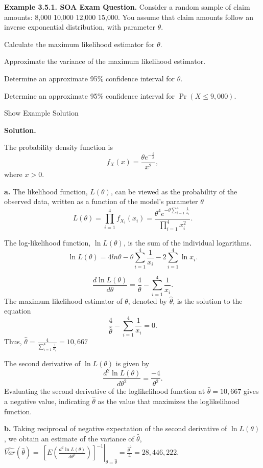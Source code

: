 \documentclass[]{book}
\theoremstyle{definition}
\theoremstyle{definition}
\theoremstyle{definition}
\theoremstyle{remark}
\begin{document}
\textbf{Example 3.5.1. SOA Exam Question.} Consider a random sample of
claim amounts: 8,000 10,000 12,000 15,000. You assume that claim amounts
follow an inverse exponential distribution, with parameter \(\theta\).

Calculate the maximum likelihood estimator for \(\theta\).

Approximate the variance of the maximum likelihood estimator.

Determine an approximate 95\% confidence interval for \(\theta\).

Determine an approximate 95\% confidence interval for
\(\Pr \left( X \leq 9,000 \right).\)

Show Example Solution

\hypertarget{toggleExampleLoss.5.1}{}
\textbf{Solution.}

The probability density function is
\[f_{X}\left( x \right) = \frac{\theta e^{- \frac{\theta}{x}}}{x^{2}}, \]
where \(x > 0\).

\textbf{a.} The likelihood function, \(L\left( \theta \right)\), can be
viewed as the probability of the observed data, written as a function of
the model's parameter \(\theta\)
\[L\left( \theta \right) = \prod_{i = 1}^{4}{f_{X_{i}}\left( x_{i} \right)} = \frac{\theta^{4}e^{- \theta\sum_{i = 1}^{4}\frac{1}{x_{i}}}}{\prod_{i = 1}^{4}x_{i}^{2}}.\]

The log-likelihood function, \(\ln L \left( \theta \right)\), is the sum
of the individual logarithms.
\[\ln L \left( \theta \right) = 4ln\theta - \theta\sum_{i = 1}^{4}\frac{1}{x_{i}} - 2\sum_{i = 1}^{4}\ln x_{i} .\]

\[\frac{d \ln L \left( \theta \right)}{d \theta} = \frac{4}{\theta} - \sum_{i = 1}^{4}\frac{1}{x_{i}}.\]
The maximum likelihood estimator of \(\theta\), denoted by
\(\hat{\theta}\), is the solution to the equation
\[\frac{4}{\hat{\theta}} - \sum_{i = 1}^{4}{\frac{1}{x_{i}} = 0}.\]
Thus,
\(\hat{\theta} = \frac{4}{\sum_{i = 1}^{4}\frac{1}{x_{i}}} = 10,667\)

The second derivative of \(\ln L \left( \theta \right)\) is given by
\[\frac{d^{2}\ln L\left( \theta \right)}{d\theta^{2}} = \frac{- 4}{\theta^{2}}.\]
Evaluating the second derivative of the loglikelihood function at
\(\hat{\theta} = 10,667\) gives a negative value, indicating
\(\hat{\theta}\) as the value that maximizes the loglikelihood function.

\textbf{b.} Taking reciprocal of negative expectation of the second
derivative of \(\ln L \left( \theta \right)\), we obtain an estimate of
the variance of \(\hat{\theta}\),
\(\widehat{Var}\left( \hat{\theta} \right) = \left. \ \left\lbrack E\left( \frac{d^{2}\ln L \left( \theta \right)}{d\theta^{2}} \right) \right\rbrack^{- 1} \right|_{\theta = \hat{\theta}} = \frac{{\hat{\theta}}^{2}}{4} = 28,446,222\).
\end{document}
